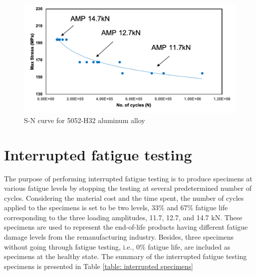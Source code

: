 \begin{figure}[tb]
  \includegraphics[width=\linewidth]{fig/sn_curve.png}
  \caption{S-N curve for 5052-H32 aluminum alloy}
  \label{fig: raw sn curve}
\end{figure}

\section{Interrupted fatigue testing}
The purpose of performing interrupted fatigue testing is to produce specimens at various fatigue levels by stopping the testing at several predetermined number of cycles. Considering the material cost and the time spent, the number of cycles applied to the specimens is set to be two levels, 33\% and 67\% fatigue life corresponding to the three loading amplitudes, 11.7, 12.7, and 14.7 kN. These specimens are used to represent the end-of-life products having different fatigue damage levels from the remanufacturing industry. Besides, three specimens without going through fatigue testing, i.e., 0\% fatigue life, are included as specimens at the healthy state. The summary of the interrupted fatigue testing specimens is presented in Table \ref{table: interrupted specimens}

